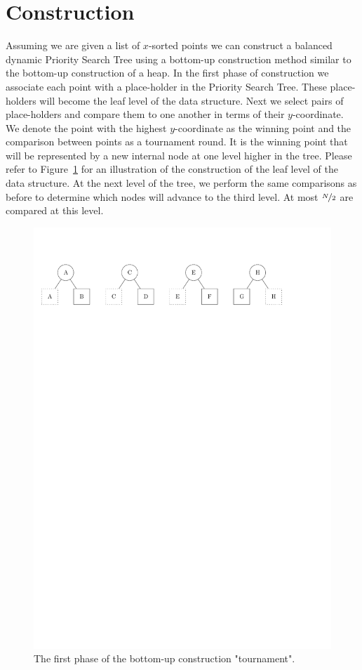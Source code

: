 \documentclass[twoside,11pt,openright]{report}
\begin{document}
\section{Construction}
Assuming we are given a list of $x$-sorted points we can construct a balanced dynamic Priority Search Tree using a bottom-up construction method similar to the bottom-up construction of a heap. In the first phase of construction we associate each point with a place-holder in the Priority Search Tree. These place-holders will become the leaf level of the data structure. Next we select pairs of place-holders and compare them to one another in terms of their $y$-coordinate. We denote the point with the highest $y$-coordinate as the winning point and the comparison between points as a tournament round. It is the winning point that will be represented by a new internal node at one level higher in the tree. Please refer to Figure~\ref{fig:dynamic_pst_construction} for an illustration of the construction of the leaf level of the data structure.
At the next level of the tree, we perform the same comparisons as before to determine which nodes will advance to the third level. At most $\nicefrac{N}{2}$ are compared at this level.

\begin{figure}[h]
	\centering
	\includegraphics[scale=0.68]{../figures/internal_pst_dynamic_construction}
	\caption{The first phase of the bottom-up construction "tournament".}
	\label{fig:dynamic_pst_construction}
\end{figure}
\end{document}
